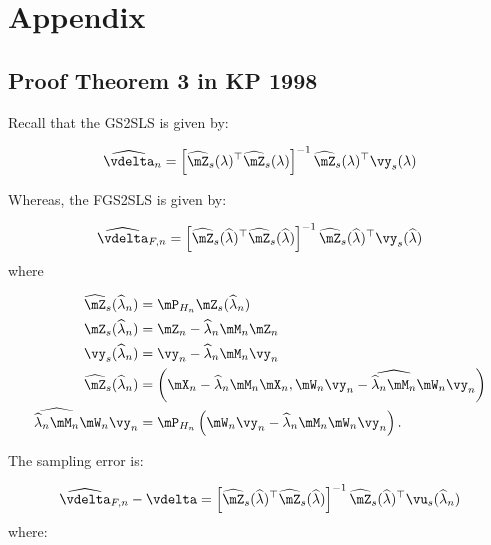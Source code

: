 \documentclass[english,12pt]{book}\usepackage[]{graphicx}\usepackage[]{xcolor}
\begin{document}
\section*{Appendix}


\begin{subappendices}

\section{Proof Theorem 3 in KP 1998}

Recall that the GS2SLS is given by:

\begin{equation}
  \widehat{\vdelta}_n = \left[\widehat{\mZ}_s(\lambda)^\top\widehat{\mZ}_s(\lambda)\right]^{-1}\widehat{\mZ}_s(\lambda)^\top\vy_s(\lambda)
\end{equation}

Whereas, the FGS2SLS is given by:

\begin{equation}
  \widehat{\vdelta}_{F, n} = \left[\widehat{\mZ}_s(\widehat{\lambda})^\top\widehat{\mZ}_s(\widehat{\lambda})\right]^{-1}\widehat{\mZ}_s(\widehat{\lambda})^\top\vy_s(\widehat{\lambda})
\end{equation}
%
where

\begin{equation}
  \begin{aligned}
    \widehat{\mZ}_s(\widehat{\lambda}_n) & = \mP_{H_n}\mZ_s(\widehat{\lambda}_n) \\
    \mZ_s(\widehat{\lambda}_n) & = \mZ_n - \widehat{\lambda}_n\mM_n\mZ_n \\
    \vy_s(\widehat{\lambda}_n) & = \vy_n - \widehat{\lambda}_n\mM_n\vy_n \\
    \widehat{\mZ}_s(\widehat{\lambda}_n) & = \left(\mX_n - \widehat{\lambda}_n\mM_n\mX_n, \mW_n\vy_n - \widehat{\widehat{\lambda}_n\mM_n}\mW_n\vy_n\right) \\
    \widehat{\widehat{\lambda}_n\mM_n}\mW_n\vy_n & = \mP_{H_n}\left(\mW_n\vy_n - \widehat{\lambda}_n\mM_n\mW_n\vy_n\right).
 \end{aligned}
\end{equation}

The sampling error is:

\begin{equation}
  \widehat{\vdelta}_{F, n} - \vdelta = \left[\widehat{\mZ}_s(\widehat{\lambda})^\top\widehat{\mZ}_s(\widehat{\lambda})\right]^{-1}\widehat{\mZ}_s(\widehat{\lambda})^\top\vu_s(\widehat{\lambda}_n)
\end{equation}
%
where:


\end{subappendices}
\end{document}
